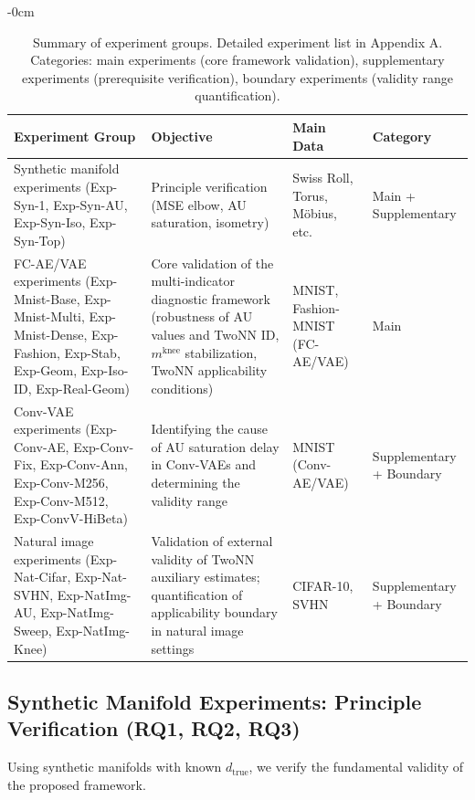 \documentclass[make,article,submit,pdftex,moreauthors]{Definitions/mdpi}
\newcommand{\dtrue}{d_{\mathrm{true}}}
\newcommand{\mknee}{m^{\mathrm{knee}}}
\begin{document}
\begin{table}[H]
\begin{adjustwidth}{-\extralength}{0cm}
\centering
\caption{Summary of experiment groups. Detailed experiment list in Appendix A. Categories: main experiments (core framework validation), supplementary experiments (prerequisite verification), boundary experiments (validity range quantification).}
\label{tab:exp_list}
\small
\begin{tabular}{p{4.5cm}p{4.0cm}p{3.0cm}p{2.5cm}}
\toprule
Experiment Group & Objective & Main Data & Category \\
\midrule
Synthetic manifold experiments
(Exp-Syn-1, Exp-Syn-AU, Exp-Syn-Iso, Exp-Syn-Top)
  & Principle verification (MSE elbow, AU saturation, isometry)
  & Swiss Roll, Torus, M\"obius, etc.
  & Main + Supplementary \\
\addlinespace
FC-AE/VAE experiments
(Exp-Mnist-Base, Exp-Mnist-Multi, Exp-Mnist-Dense, Exp-Fashion, Exp-Stab, Exp-Geom, Exp-Iso-ID, Exp-Real-Geom)
  & Core validation of the multi-indicator diagnostic framework (robustness of AU values and TwoNN ID, $\mknee$ stabilization, TwoNN applicability conditions)
  & MNIST, Fashion-MNIST (FC-AE/VAE)
  & Main \\
\addlinespace
Conv-VAE experiments
(Exp-Conv-AE, Exp-Conv-Fix, Exp-Conv-Ann, Exp-Conv-M256, Exp-Conv-M512, Exp-ConvV-HiBeta)
  & Identifying the cause of AU saturation delay in Conv-VAEs and determining the validity range
  & MNIST (Conv-AE/VAE)
  & Supplementary + Boundary \\
\addlinespace
Natural image experiments
(Exp-Nat-Cifar, Exp-Nat-SVHN, Exp-NatImg-AU, Exp-NatImg-Sweep, Exp-NatImg-Knee)
  & Validation of external validity of TwoNN auxiliary estimates; quantification of applicability boundary in natural image settings
  & CIFAR-10, SVHN
  & Supplementary + Boundary \\
\bottomrule
\end{tabular}
\end{adjustwidth}
\end{table}

\subsection{Synthetic Manifold Experiments: Principle Verification (RQ1, RQ2, RQ3)}\label{sec:exp_synthetic}

Using synthetic manifolds with known $\dtrue$, we verify the fundamental validity of the proposed framework.
\end{document}
